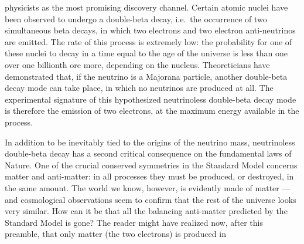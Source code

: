 physicists as the most promising discovery channel. Certain atomic nuclei have been
observed to undergo a double-beta decay, i.e.~the occurrence of two simultaneous beta
decays, in which two electrons and two electron anti-neutrinos are emitted. The rate of
this process is extremely low: the probability for one of these nuclei to decay in a time
equal to the age of the universe is less than one over one billionth ore more, depending
on the nucleus. Theoreticians have demonstrated that, if the neutrino is a Majorana
particle, another double-beta decay mode can take place, in which no neutrinos are
produced at all. The experimental signature of this hypothesized neutrinoless double-beta
decay mode is therefore the emission of two electrons, at the maximum energy available in
the process.
\newpar
\begin{center}
\end{center}
In addition to be inevitably tied to the origins of the neutrino mass, neutrinoless
double-beta decay has a second critical consequence on the fundamental laws of Nature. One
of the crucial conserved symmetries in the Standard Model concerns matter and anti-matter:
in all processes they must be produced, or destroyed, in the same amount.  The world we
know, however, is evidently made of matter --- and cosmological observations seem to
confirm that the rest of the universe looks very similar. How can it be that all the
balancing anti-matter predicted by the Standard Model is gone? The reader might have
realized now, after this preamble, that only matter (the two electrons) is produced in
